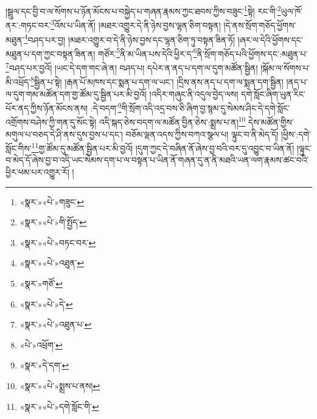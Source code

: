 །སྦྲུལ་དང་བྱི་བ་ལ་སོགས་པ་ཉོན་མོངས་པ་བསྐྱེད་པ་གཞན་རྣམས་ཀྱང་ཐབས་ཀྱིས་བཟུང་\footnote{«སྣར་»«པེ་»གཟུང་}སྟེ། རང་གི་\footnote{«སྣར་»«པེ་»གི་སྤྱོད་}ཡུལ་ཁོ་ནར་:གཏང་བར་\footnote{«སྣར་»«པེ་»བཏང་བར་}འོས་པ་ཡིན་ནོ། །མཐར་འགྱུར་དེ་ནི་ཉེས་བྱས་ལྷན་ཅིག་བསྟན། །དེ་ནས་སྲོག་གཅོད་ཕྱོགས་མཐུན་\footnote{«སྣར་»«པེ་»འཐུན་}བཤད་པར་བྱ། །མཐར་འགྱུར་བ་དེ་ནི་ཉེས་བྱས་དང་ལྷན་ཅིག་ཏུ་བསྟན་ཟིན་ཏོ། །ཞར་ལ་དེའི་ཕྱོགས་དང་མཐུན་པ་དག་ཀྱང་བསྟན་ཟིན་ན། གཙོར་\footnote{«སྣར་»གཙོ་}ནི་མ་ཡིན་པས་དེའི་ཕྱིར་ད་\footnote{«སྣར་»«པེ་»དེ་}ནི་སྲོག་གཅོད་པའི་ཕྱོགས་དང་:མཐུན་པ་\footnote{«སྣར་»«པེ་»འཐུན་པ་}བཤད་པར་བྱའོ། །ཡང་དེ་དག་གང་ཞེ་ན། བཤད་པ། དཔེར་ན་ནད་པ་དག་ལ་དུག་མཚོན་སྦྱིན། །སྐོམ་ལ་སོགས་པ་མི་འཕྲོད་\footnote{«པེ་»འཕྲོག་}སྦྱིན་པ་སྟེ། །རྒན་པོ་མཁས་དང་སྨན་པ་དག་ལ་ཡང་། །དྲིས་ནས་ནད་པ་དག་ལ་སྨན་དག་སྦྱིན། །ནད་པ་ལ་དུག་གམ་མཚོན་དག་གྱ་ཚོམ་དུ་སྦྱིན་པར་མི་བྱའོ། །འདིར་གཞུང་ནི་འདུལ་བྱེད་ལས། དགེ་སློང་ཞིག་ཡུན་རིང་པོར་ནད་ཀྱིས་ཉོན་མོངས་ནས། :དེ་བདག་\footnote{«སྣར་»དེ་དག་}གི་སྲོག་འདི་འདྲ་བས་ཅི་ཞིག་བྱ་སྙམ་དུ་སེམས་ཤིང་དེ་དགེ་སློང་འགྲོགས་བཤེས་ཀྱི་གན་དུ་སོང་སྟེ། འདི་སྐད་ཅེས་བདག་ལ་མཚོན་བྱིན་ཅེས་:སྨྲས་པ་ན།\footnote{«སྣར་»«པེ་»སྨྲས་པ་ནས།} དེས་མཚོན་གྱིས་མགུལ་པ་བཅད་དེ་ཤི་ནས་དུས་བྱས་པ་དང་། བཅོམ་ལྡན་འདས་ཀྱིས་བཀའ་སྩལ་པ། ལྟུང་བ་ནི་མེད་དོ། །ཕྱིས་:དགེ་སློང་གིས་\footnote{«སྣར་»«པེ་»དགེ་སློང་གི་}གྱ་ཚོམ་དུ་མཚོན་སྦྱིན་པར་མི་བྱའོ། །དུག་ཀྱང་དེ་བཞིན་ནོ་ཞེས་བྱ་བའི་བར་དུ་འབྱུང་བ་ཡིན་ནོ། །ལྟུང་བ་མེད་དོ་ཞེས་བྱ་བ་འདི་ཡང་སེམས་དག་པ་ལ་བསྟན་པ་ཡིན་ནོ་གཞན་དུ་ན་ནི་མཐའི་ཡན་ལག་རྣམས་ཚང་བའི་ཕྱིར་ཕམ་པར་འགྱུར་རོ། །
